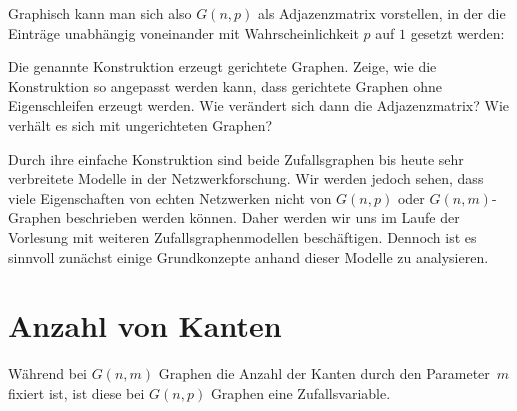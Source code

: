 \noindent
Graphisch kann man sich also $G(n, p)$ als Adjazenzmatrix vorstellen, in der die Einträge unabhängig voneinander mit Wahrscheinlichkeit $p$ auf $1$ gesetzt werden:

\begin{center}

\end{center}

\begin{exercise}
    Die genannte Konstruktion erzeugt gerichtete Graphen.
    Zeige, wie die Konstruktion so angepasst werden kann, dass gerichtete Graphen ohne Eigenschleifen erzeugt werden.
    Wie verändert sich dann die Adjazenzmatrix?
    Wie verhält es sich mit ungerichteten Graphen?
\end{exercise}

Durch ihre einfache Konstruktion sind beide Zufallsgraphen bis heute sehr verbreitete Modelle in der Netzwerkforschung.
Wir werden jedoch sehen, dass viele Eigenschaften von echten Netzwerken nicht von $G(n,p)$ oder $G(n,m)$-Graphen beschrieben werden können.
Daher werden wir uns im Laufe der Vorlesung mit weiteren Zufallsgraphenmodellen beschäftigen.
Dennoch ist es sinnvoll zunächst einige Grundkonzepte anhand dieser Modelle zu analysieren.

\section{Anzahl von Kanten}
Während bei $G(n,m)$ Graphen die Anzahl der Kanten durch den Parameter~$m$ fixiert ist, ist diese bei $G(n,p)$ Graphen eine Zufallsvariable.

